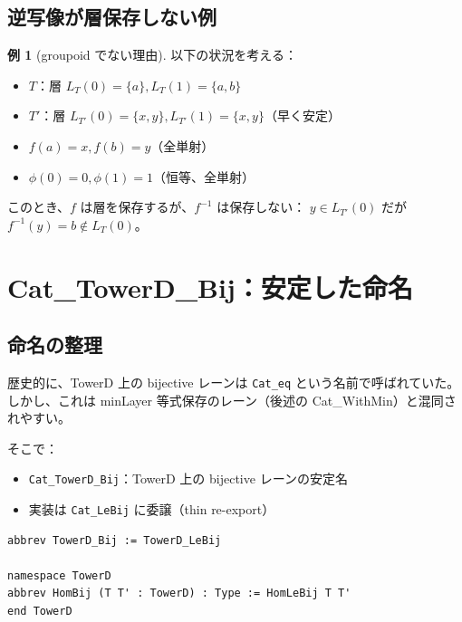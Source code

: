 \documentclass{ltjsarticle}
\theoremstyle{definition}
\newtheorem{example}[definition]{例}
\begin{document}
\subsection{逆写像が層保存しない例}

\begin{example}[groupoid でない理由]
以下の状況を考える：
\begin{itemize}
  \item $T$：層 $L_T(0) = \{a\}, L_T(1) = \{a, b\}$
  \item $T'$：層 $L_{T'}(0) = \{x, y\}, L_{T'}(1) = \{x, y\}$（早く安定）
  \item $f(a) = x, f(b) = y$（全単射）
  \item $\phi(0) = 0, \phi(1) = 1$（恒等、全単射）
\end{itemize}
このとき、$f$ は層を保存するが、$f^{-1}$ は保存しない：
$y \in L_{T'}(0)$ だが $f^{-1}(y) = b \notin L_T(0)$。
\end{example}

\section{Cat\_TowerD\_Bij：安定した命名}
\label{sec:cat-towerd-bij}

\subsection{命名の整理}

歴史的に、TowerD 上の bijective レーンは \texttt{Cat\_eq} という名前で呼ばれていた。
しかし、これは minLayer 等式保存のレーン（後述の Cat\_WithMin）と混同されやすい。

そこで：
\begin{itemize}
  \item \texttt{Cat\_TowerD\_Bij}：TowerD 上の bijective レーンの安定名
  \item 実装は \texttt{Cat\_LeBij} に委譲（thin re-export）
\end{itemize}

\begin{leanbox}
\begin{lstlisting}
abbrev TowerD_Bij := TowerD_LeBij

namespace TowerD
abbrev HomBij (T T' : TowerD) : Type := HomLeBij T T'
end TowerD
\end{lstlisting}
\end{leanbox}
\end{document}
